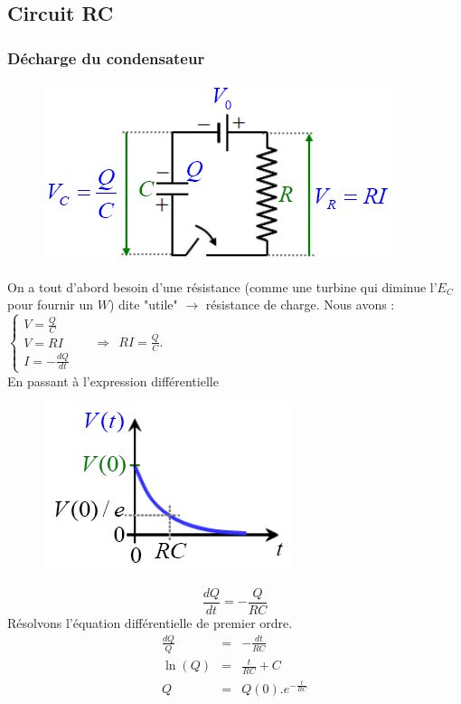 \documentclass	[11pt, a4paper, openany]{book}
\begin{document}
\subsection{Circuit RC}
\subsubsection{Décharge du condensateur}
\begin{figure}
	\includegraphics[scale=0.44]{es/image19.png}
\end{figure}
On a tout d'abord besoin d'une résistance (comme une turbine qui diminue l'$E_C$ pour fournir un $W$) dite "utile" $\rightarrow$ résistance de charge. Nous avons :\\
$\left\{\begin{array}{l}
V = \frac{Q}{C}\\
V = RI\\
I = -\frac{dQ}{dt}
\end{array}\right.$\ \ \ $\Rightarrow\ \ RI = \frac{Q}{C}$.\\
En passant à l'expression différentielle
\begin{figure}
	\includegraphics[scale=0.44]{es/image20.png}
\end{figure}
\begin{equation}
	\frac{dQ}{dt} = - \frac{Q}{RC}
\end{equation}
Résolvons l'équation différentielle de premier ordre.
\begin{eqnarray}
	\frac{dQ}{Q} &=& -\frac{dt}{RC}\\
	\ln (Q) &=& \frac{t}{RC} + C\\
	Q &=& Q(0).e^{-\frac{t}{RC}}
\end{eqnarray}
\end{document}
